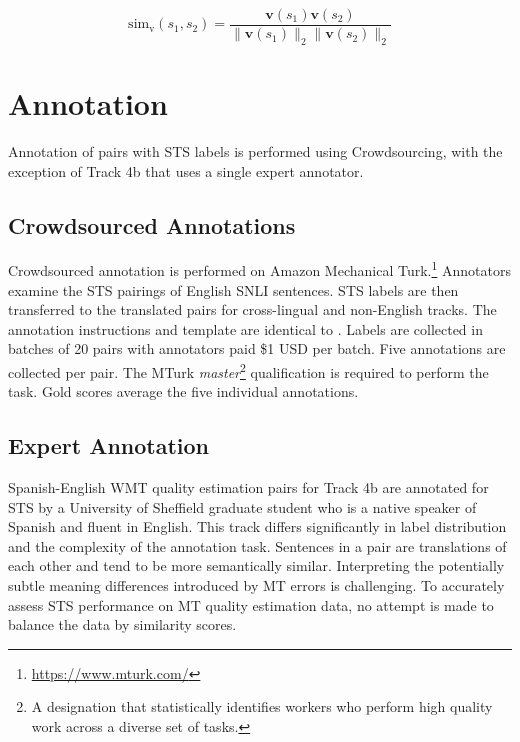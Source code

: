 \documentclass[11pt,a4paper]{article}
\begin{document}
\begin{equation}
\label{deepsim}
\text{sim}_{\text{v}}(s_1, s_2) = \frac {\mathbf{v}(s_1) \mathbf{v}(s_2)}{\lVert\mathbf{v}(s_1)\rVert_2 \lVert\mathbf{v}(s_2)\rVert_2}
\end{equation}

\section{Annotation}

Annotation of pairs with STS labels is performed using Crowdsourcing, with the exception of Track 4b that uses a single expert annotator.

\subsection{Crowdsourced Annotations}

Crowdsourced annotation is performed on Amazon Mechanical Turk.\footnote{\url{https://www.mturk.com/}} Annotators examine the STS pairings of English SNLI sentences. STS labels are then transferred to the translated pairs for cross-lingual and non-English tracks.
The annotation instructions and template are identical to . 
Labels are collected in batches of 20 pairs with annotators paid \$1 USD per batch. Five annotations are collected per pair. The MTurk {\em master}\footnote{A designation that statistically identifies workers who perform high quality work across a diverse set of tasks.}  qualification is required to perform the task. Gold scores average the five individual annotations.

\subsection{Expert Annotation}

Spanish-English WMT quality estimation pairs for Track 4b are annotated for STS by a University of Sheffield graduate student who is a native speaker of Spanish and fluent in English. This track differs significantly in label distribution and the complexity of the annotation task. Sentences in a pair are translations of each other and tend to be more semantically similar. Interpreting the potentially subtle meaning differences introduced by MT errors is challenging. To accurately assess STS performance on MT quality estimation data, no attempt is made to balance the data by similarity scores.
\end{document}

